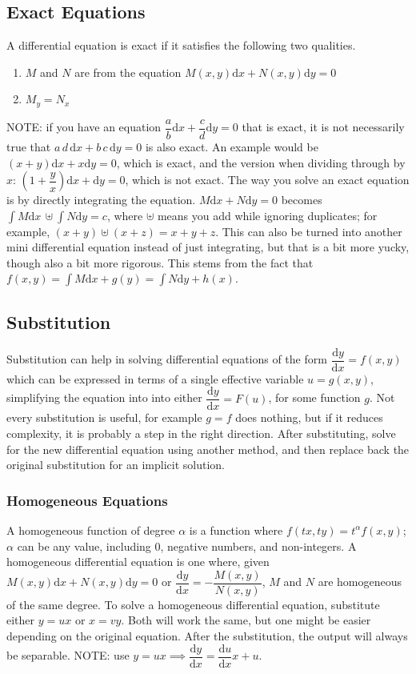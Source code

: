 \documentclass[12pt]{article}
\newcommand \dstyle \displaystyle
\renewcommand \d [1] {\mathrm{d}{#1}}
\newcommand \dx {{\d x}}
\newcommand \dy {{\d y}}
\newcommand \dydx {\dfrac \dy\dx}
\newcommand \ddf [2] {\dfrac{\d{#1}}{\d{#2}}}
\begin{document}
\subsection{Exact Equations}

A differential equation is exact if it satisfies the following two qualities.
\begin{enumerate}
	\item $M$ and $N$ are from the equation $M(x, y) \dx + N(x, y) \dy = 0$
	\item $M_y = N_x$
\end{enumerate}

NOTE: if you have an equation $\dfrac a b \dx + \dfrac c d \dy = 0$ that is exact, it is not necessarily true that $a\,d\,\dx + b\,c\,\dy = 0$ is also exact. An example would be $(x + y) \dx + x \dy = 0$, which is exact, and the version when dividing through by $x$: $\left(1 + \dfrac y x\right) \dx + \dy = 0$, which is not exact. The way you solve an exact equation is by directly integrating the equation. $M \dx + N \dy = 0$ becomes $\dstyle \int\!M \dx \, \uplus \int\!N \dy = c$, where $\uplus$ means you add while ignoring duplicates; for example, $(x + y) \uplus (x + z) = x + y + z$. This can also be turned into another mini differential equation instead of just integrating, but that is a bit more yucky, though also a bit more rigorous. This stems from the fact that $f(x, y) = \int M \dx + g(y) = \int N \dy + h(x)$.

\subsection{Substitution}

Substitution can help in solving differential equations of the form $\dydx = f(x, y)$ which can be expressed in terms of a single effective variable $u = g(x, y)$, simplifying the equation into into either $\dydx = F(u)$, for some function $g$. Not every substitution is useful, for example $g = f$ does nothing, but if it reduces complexity, it is probably a step in the right direction. After substituting, solve for the new differential equation using another method, and then replace back the original substitution for an implicit solution.

\subsubsection{Homogeneous Equations}

A homogeneous function of degree $\alpha$ is a function where $f(tx, ty) = t^\alpha f(x, y)$; $\alpha$ can be any value, including 0, negative numbers, and non-integers. A homogeneous differential equation is one where, given $M(x, y) \dx + N(x, y) \dy = 0$ or $\dstyle \dydx = -\dfrac{M(x, y)}{N(x, y)}$, $M$ and $N$ are homogeneous of the same degree. To solve a homogeneous differential equation, substitute either $y = ux$ or $x = v y$. Both will work the same, but one might be easier depending on the original equation. After the substitution, the output will always be separable. NOTE: use $y = u x \implies \dydx = \ddf ux x + u$.
	
\end{document}
